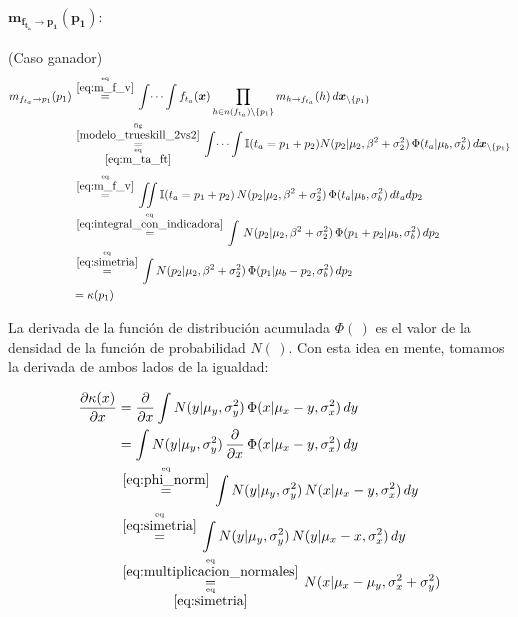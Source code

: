 \documentclass[article]{jss}
\newcommand\hfrac[2]{\genfrac{}{}{0pt}{}{#1}{#2}} %
\begin{document}
\paragraph{$\bm{m_{f_{t_a} \rightarrow p_1}(p_1)}:$} (Caso ganador)
\begin{equation}\label{eq:m_fta_p_inicial}
\begin{split}
m_{f_{t_a} \rightarrow p_1}(p_1)  &\overset{\hfrac{\text{eq}}{\ref{eq:m_f_v}}}{=} \int \dots \int f_{t_a}(\bm{x}) \prod_{h \in n(f_{t_a}) \setminus \{p_1\} } m_{h \rightarrow f_{t_a}}(h) \, d\bm{x}_{\setminus \{p_1\} }  \\
&\overset{\hfrac{\text{fig}}{\ref{modelo_trueskill_2vs2}}}{\underset{\hfrac{\text{eq}}{\ref{eq:m_ta_ft}}}{=}} \int \dots \int \mathbb{I}( t_a = p_1 + p_2) N(p_2| \mu_2, \beta^2 + \sigma_2^2 ) \, \Phi (t_a| \mu_b , \sigma_b^2 ) \, d\bm{x}_{\setminus \{p_1\} }\\[0.1cm]
&\overset{\hfrac{\text{eq}}{\ref{eq:m_f_v}}}{=} \iint \mathbb{I}( t_a = p_1 + p_2) \, N(p_2| \mu_2, \beta^2 + \sigma_2^2 ) \, \Phi (t_a| \mu_b , \sigma_b^2 ) \, dt_a dp_2 \\
&\overset{\hfrac{\text{eq}}{\ref{eq:integral_con_indicadora}}}{=} \int  \, N(p_2| \mu_2, \beta^2 + \sigma_2^2 ) \, \Phi (p_1 + p_2| \mu_b , \sigma_b^2 ) \, dp_2 \\
&\overset{\hfrac{\text{eq}}{\ref{eq:simetria}}}{=} \int  N(p_2| \mu_2, \beta^2 + \sigma_2^2 ) \, \Phi (p_1 | \mu_b - p_2 , \sigma_b^2) \, dp_2 \\
&= \kappa(p_1)
\end{split}
\end{equation}

La derivada de la funci\'on de distribuci\'on acumulada $\Phi(\,)$ es el valor de la densidad de la funci\'on de probabilidad $N(\,)$. Con esta idea en mente, tomamos la derivada de ambos lados de la igualdad:

\begin{equation}\label{eq:ta-p_derivada}
\begin{split}
\frac{\partial\kappa(x)}{\partial x} &= \frac{\partial}{\partial x} \int  N(y| \mu_y, \sigma_y^2 ) \,   \Phi (x | \mu_x -y , \sigma_x^2 ) \, dy \\
&= \int  N(y| \mu_y, \sigma_y^2 ) \, \frac{\partial}{\partial x} \,\Phi (x| \mu_x - y, \sigma_x^2 )  \, dy   \\
& \overset{\hfrac{\text{eq}}{\ref{eq:phi_norm}}}{=} \int  N(y| \mu_y, \sigma_y^2 ) \, N(x| \mu_x -y , \sigma_x^2)  \, dy  \\
& \overset{\hfrac{\text{eq}}{\ref{eq:simetria}}}{=} \int  N(y| \mu_y, \sigma_y^2 ) \, N(y| \mu_x  -x , \sigma_x^2)  \, dy  \\
&\overset{\hfrac{\text{eq}}{\ref{eq:multiplicacion_normales}}}{\underset{\hfrac{\text{eq}}{\ref{eq:simetria}}}{=}} N(x| \mu_x - \mu_y, \sigma_x^2 + \sigma_y^2)
\end{split}
\end{equation}
\end{document}
